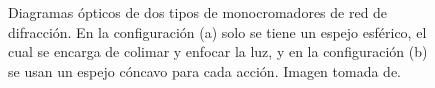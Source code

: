 \begin{figure}[h]
	\centering
	\label{fig:Configuraciones}
	\caption[Diagramas ópticos de dos tipos de monocromadores de red de difracción.]{Diagramas ópticos de dos tipos de monocromadores de red de difracción. En la configuración (a) solo se tiene un espejo esférico, el cual se encarga de colimar y enfocar la luz, y en la configuración (b) se usan un espejo cóncavo para cada acción. Imagen tomada de. \cite{Gratings2008}} 
	
\end{figure}


